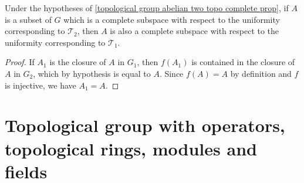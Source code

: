 \begin{corollary}\label{topological group abelian two topo complete subset}
Under the hypotheses of \cref{topological group abelian two topo complete prop}, if $A$ is a subset of $G$ which is a complete subspace with respect to the uniformity corresponding to $\mathcal{T}_2$, then $A$ is also a complete subspace with respect to the uniformity corresponding to $\mathcal{T}_1$.
\end{corollary}
\begin{proof}
If $A_1$ is the closure of $A$ in $G_1$, then $f(A_1)$ is contained in the closure of $A$ in $G_2$, which by hypothesis is equal to $A$. Since $f(A)=A$ by definition and $f$ is injective, we have $A_1=A$.
\end{proof}
\section{Topological group with operators, topological rings, modules and fields}
